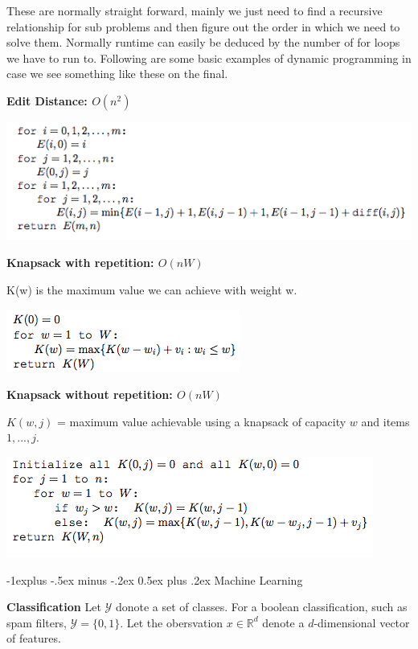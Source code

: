 \documentclass[landscape]{article}
\makeatletter
\renewcommand{\subsection}{\@startsection{subsection}{2}{0mm}%
                            {-1explus -.5ex minus -.2ex}%
                            {0.5ex plus .2ex}%
                            {\normalfont\normalsize\bfseries}}
\makeatother
\begin{document}
\begin{multicols}{3}
These are normally straight forward, mainly we just need to find a recursive relationship for sub problems and then figure out the order in which we need to solve them.
Normally runtime can easily be deduced by the number of for loops we have to run to.
Following are some basic examples of dynamic programming in case we see something like these on the final.

\textbf{Edit Distance: $O(n^2)$}

\includegraphics[scale=0.42]{edit}

\textbf{Knapsack with repetition: $O(nW)$}

K(w) is the maximum value we can achieve with weight w.

\includegraphics[scale=0.5]{knapNR}

\textbf{Knapsack without repetition: $O(nW)$}

$K(w, j)$ = maximum value achievable using a knapsack of capacity $w$ and items $1, . . . , j$.

\includegraphics[scale=0.5]{knapWR}

\subsection{Machine Learning}

\textbf{Classification}
Let $\mathcal{Y}$ donote a set of classes. For a boolean classification, such as spam filters, $\mathcal{Y} = \{0, 1\}$. Let the obersvation $x \in \mathbb{R}^d$ denote a $d$-dimensional vector of features.


\end{multicols}
\end{document}
